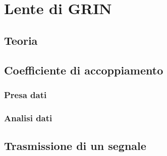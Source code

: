 \documentclass[a4paper]{article}
\begin{document}
\section{Lente di GRIN}

\subsection{Teoria}

\subsection{Coefficiente di accoppiamento}

\subsubsection{Presa dati}

\subsubsection{Analisi dati}

\subsection{Trasmissione di un segnale}
	
\end{document}
